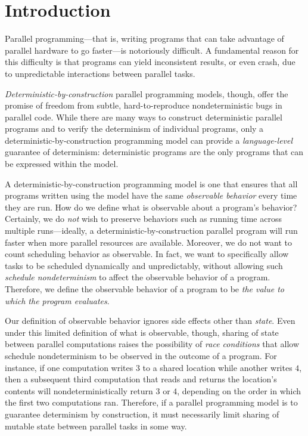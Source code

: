 \chapter{Introduction}\label{ch:intro} %

Parallel programming---that is, writing programs that can take
advantage of parallel hardware to go faster---is notoriously
difficult.  A fundamental reason for this difficulty is that programs
can yield inconsistent results, or even crash, due to unpredictable
interactions between parallel tasks.

\emph{Deterministic-by-construction} parallel programming models,
though, offer the promise of freedom from subtle, hard-to-reproduce
nondeterministic bugs in parallel code.  While there are many ways to
construct deterministic parallel programs and to verify the
determinism of individual programs, only a
deterministic-by-construction programming model can provide a
\emph{language-level} guarantee of determinism:
deterministic programs are the only programs that can be expressed
within the model.

A deterministic-by-construction programming model is one that ensures
that all programs written using the model have the same
\emph{observable behavior} every time they are run.  How do we define
what is observable about a program's behavior?  Certainly, we do
\emph{not} wish to preserve behaviors such as running time across
multiple runs---ideally, a deterministic-by-construction parallel
program will run faster when more parallel resources are available.
Moreover, we do not want to count scheduling behavior as observable.
In fact, we want to specifically allow tasks to be scheduled
dynamically and unpredictably, without allowing such \emph{schedule
  nondeterminism} to affect the observable behavior of a program.
Therefore, we define the observable behavior of a program to be
\emph{the value to which the program evaluates}.


Our definition of observable behavior ignores side effects other than
\emph{state}.  Even under this limited definition of what is
observable, though, sharing of state between parallel computations
raises the possibility of \emph{race conditions} that allow schedule
nondeterminism to be observed in the outcome of a program.  For
instance, if one computation writes $3$ to a shared location while
another writes $4$, then a subsequent third computation that reads and
returns the location's contents will nondeterministically return $3$
or $4$, depending on the order in which the first two computations
ran.  Therefore, if a parallel programming model is to guarantee
determinism by construction, it must necessarily limit sharing of
mutable state between parallel tasks in some way.


